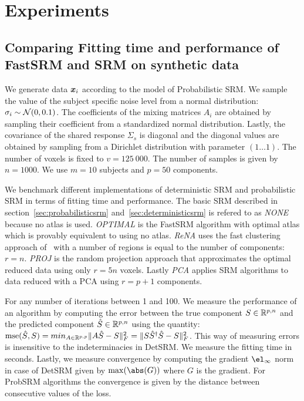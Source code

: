 \section{Experiments}
\subsection{Comparing Fitting time and performance of FastSRM and
  SRM on synthetic data}
We generate data $\boldsymbol{x}_i$ according to the model of Probabilistic SRM. We sample the value of the subject specific noise level from a normal
distribution: $\sigma_i \sim \mathcal{N}(0, 0.1)$. The coefficients of the mixing matrices $A_i$
are obtained by sampling their coefficient from a standardized normal distribution.
Lastly, the covariance of the shared response $\Sigma_s$ is diagonal and the
diagonal values are obtained by sampling from a Dirichlet distribution with
parameter $(1 \dots 1)$.
The number of voxels is fixed to $v=125~000$. The number of samples is given by
$n=1000$. We use $m=10$ subjects and $p=50$ components.

We benchmark different implementations of deterministic SRM and probabilistic
SRM in terms of fitting time and performance. The basic SRM described in
section~\ref{sec:probabilisticsrm} and~\ref{sec:deterministicsrm} is refered to
as \emph{NONE} because no atlas is used. 
\emph{OPTIMAL} is the FastSRM algorithm with optimal atlas which is provably
equivalent to using no atlas. \emph{ReNA} uses the fast clustering approach
of~\cite{hoyos2018recursive} with a number of regions is equal to the number of
components: $r=n$. \emph{PROJ} is the random projection approach that
approximates the optimal reduced data using only $r=5n$ voxels. Lastly
\emph{PCA} applies SRM algorithms to data reduced with a PCA using $r=p+1$ components.

For any number of iterations between 1 and 100.
We measure the performance of an algorithm by computing the error between the true component $S \in \mathbb{R}^{p, n}$ and
the predicted component $\hat{S} \in \mathbb{R}^{p, n}$ using the quantity:
$\mathrm{mse}(\hat{S}, S) = min_{A \in \mathbb{R}^{p, p}} \|A \hat{S} - S \|^2_F =  \|S
\hat{S}^{\dagger}\hat{S} - S \|^2_F$. This way of measuring errors is
insensitive to the indeterminacies in DetSRM.
We measure the fitting time in seconds.
Lastly, we measure convergence by computing the gradient $\el_{\infty}$ norm in
case of DetSRM given by $\max(\abs(G))$ where $G$ is the gradient. For ProbSRM
algorithms the convergence is given by the distance between consecutive values of the loss.

